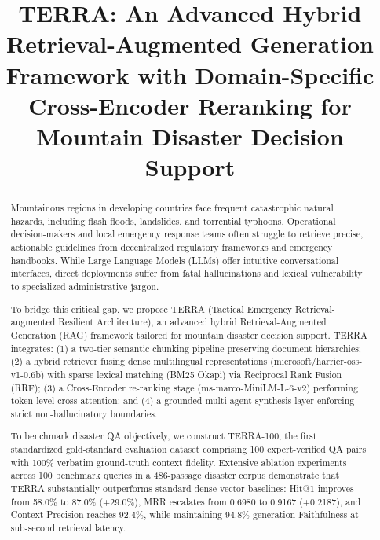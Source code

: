 \documentclass[conference]{IEEEtran}
\begin{document}
\title{TERRA: An Advanced Hybrid Retrieval-Augmented Generation Framework with Domain-Specific Cross-Encoder Reranking for Mountain Disaster Decision Support}

\author{
}

\maketitle

\begin{abstract}
Mountainous regions in developing countries face frequent catastrophic natural hazards, including flash floods, landslides, and torrential typhoons. Operational decision-makers and local emergency response teams often struggle to retrieve precise, actionable guidelines from decentralized regulatory frameworks and emergency handbooks. While Large Language Models (LLMs) offer intuitive conversational interfaces, direct deployments suffer from fatal hallucinations and lexical vulnerability to specialized administrative jargon.

To bridge this critical gap, we propose TERRA (Tactical Emergency Retrieval-augmented Resilient Architecture), an advanced hybrid Retrieval-Augmented Generation (RAG) framework tailored for mountain disaster decision support. TERRA integrates: (1) a two-tier semantic chunking pipeline preserving document hierarchies; (2) a hybrid retriever fusing dense multilingual representations (microsoft/harrier-oss-v1-0.6b) with sparse lexical matching (BM25 Okapi) via Reciprocal Rank Fusion (RRF); (3) a Cross-Encoder re-ranking stage (ms-marco-MiniLM-L-6-v2) performing token-level cross-attention; and (4) a grounded multi-agent synthesis layer enforcing strict non-hallucinatory boundaries.

To benchmark disaster QA objectively, we construct TERRA-100, the first standardized gold-standard evaluation dataset comprising 100 expert-verified QA pairs with 100\% verbatim ground-truth context fidelity. Extensive ablation experiments across 100 benchmark queries in a 486-passage disaster corpus demonstrate that TERRA substantially outperforms standard dense vector baselines: Hit@1 improves from 58.0\% to 87.0\% (+29.0\%), MRR escalates from 0.6980 to 0.9167 (+0.2187), and Context Precision reaches 92.4\%, while maintaining 94.8\% generation Faithfulness at sub-second retrieval latency.
\end{abstract}
\end{document}
